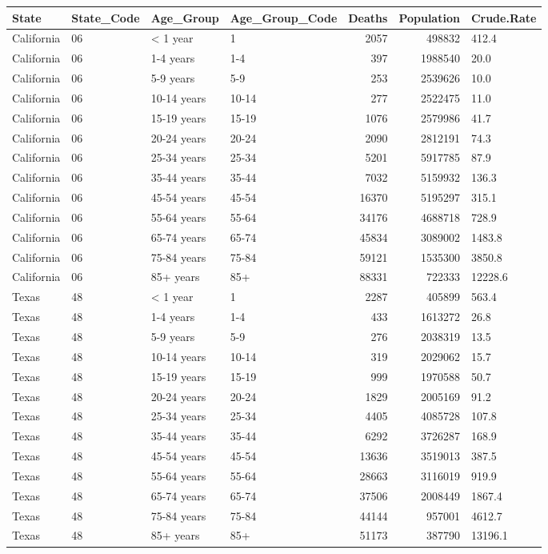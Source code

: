 \documentclass[
]{article}
\begin{document}
\captionsetup[table]{labelformat=empty,skip=1pt}
\begin{longtable}{llllrrl}
\toprule
State & State\_Code & Age\_Group & Age\_Group\_Code & Deaths & Population & Crude.Rate \\ 
\midrule
California & 06 & < 1 year & 1 & 2057 & 498832 & 412.4 \\ 
California & 06 & 1-4 years & 1-4 & 397 & 1988540 & 20.0 \\ 
California & 06 & 5-9 years & 5-9 & 253 & 2539626 & 10.0 \\ 
California & 06 & 10-14 years & 10-14 & 277 & 2522475 & 11.0 \\ 
California & 06 & 15-19 years & 15-19 & 1076 & 2579986 & 41.7 \\ 
California & 06 & 20-24 years & 20-24 & 2090 & 2812191 & 74.3 \\ 
California & 06 & 25-34 years & 25-34 & 5201 & 5917785 & 87.9 \\ 
California & 06 & 35-44 years & 35-44 & 7032 & 5159932 & 136.3 \\ 
California & 06 & 45-54 years & 45-54 & 16370 & 5195297 & 315.1 \\ 
California & 06 & 55-64 years & 55-64 & 34176 & 4688718 & 728.9 \\ 
California & 06 & 65-74 years & 65-74 & 45834 & 3089002 & 1483.8 \\ 
California & 06 & 75-84 years & 75-84 & 59121 & 1535300 & 3850.8 \\ 
California & 06 & 85+ years & 85+ & 88331 & 722333 & 12228.6 \\ 
Texas & 48 & < 1 year & 1 & 2287 & 405899 & 563.4 \\ 
Texas & 48 & 1-4 years & 1-4 & 433 & 1613272 & 26.8 \\ 
Texas & 48 & 5-9 years & 5-9 & 276 & 2038319 & 13.5 \\ 
Texas & 48 & 10-14 years & 10-14 & 319 & 2029062 & 15.7 \\ 
Texas & 48 & 15-19 years & 15-19 & 999 & 1970588 & 50.7 \\ 
Texas & 48 & 20-24 years & 20-24 & 1829 & 2005169 & 91.2 \\ 
Texas & 48 & 25-34 years & 25-34 & 4405 & 4085728 & 107.8 \\ 
Texas & 48 & 35-44 years & 35-44 & 6292 & 3726287 & 168.9 \\ 
Texas & 48 & 45-54 years & 45-54 & 13636 & 3519013 & 387.5 \\ 
Texas & 48 & 55-64 years & 55-64 & 28663 & 3116019 & 919.9 \\ 
Texas & 48 & 65-74 years & 65-74 & 37506 & 2008449 & 1867.4 \\ 
Texas & 48 & 75-84 years & 75-84 & 44144 & 957001 & 4612.7 \\ 
Texas & 48 & 85+ years & 85+ & 51173 & 387790 & 13196.1 \\ 
\bottomrule
\end{longtable}
\end{document}
